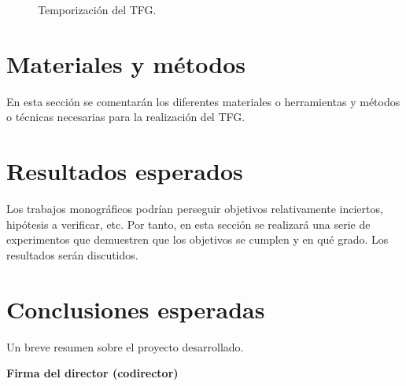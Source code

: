 \documentclass[titlepage, 12pt, a4paper, oneside]{article}
\begin{document}
\begin{figure}
  \begin{center}
  \end{center}
  \caption{Temporización del TFG.\label{fig:temporizacion}}
\end{figure}


\section{Materiales y métodos}
En esta sección se comentarán los diferentes materiales o herramientas
y métodos o técnicas necesarias para la realización del TFG.

\section{Resultados esperados}
Los trabajos monográficos podrían perseguir objetivos relativamente
inciertos, hipótesis a verificar, etc. Por tanto, en esta sección se
realizará una serie de experimentos que demuestren que los objetivos
se cumplen y en qué grado. Los resultados serán discutidos.

\section{Conclusiones esperadas}
Un breve resumen sobre el proyecto desarrollado.




\begin{center}
  \textbf{Firma del director (codirector)}
\end{center}
\end{document}
